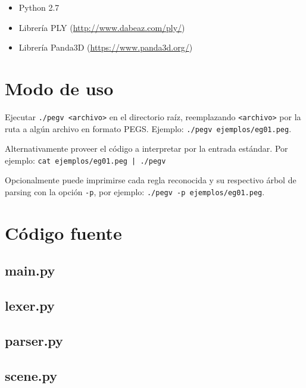 \documentclass[a4paper, 10pt, twoside]{article}
\begin{document}
\begin{itemize}
  \item Python 2.7
  \item Librería PLY (\url{http://www.dabeaz.com/ply/})
  \item Librería Panda3D (\url{https://www.panda3d.org/})
\end{itemize}


\section{Modo de uso}

Ejecutar \texttt{./pegv <archivo>} en el directorio raíz, reemplazando \texttt{<archivo>} por la ruta a algún archivo en formato PEGS. Ejemplo: \texttt{./pegv ejemplos/eg01.peg}.

Alternativamente proveer el código a interpretar por la entrada estándar. Por ejemplo: \texttt{cat ejemplos/eg01.peg | ./pegv}

Opcionalmente puede imprimirse cada regla reconocida y su respectivo árbol de parsing con la opción \texttt{-p}, por ejemplo: \texttt{./pegv -p ejemplos/eg01.peg}.


\section{Código fuente}


\subsection{main.py}

\begin{small}
  
\end{small}


\subsection{lexer.py}

\begin{small}
  
\end{small}


\subsection{parser.py}

\begin{small}
  
\end{small}


\subsection{scene.py}

\begin{small}
  
\end{small}
\end{document}
